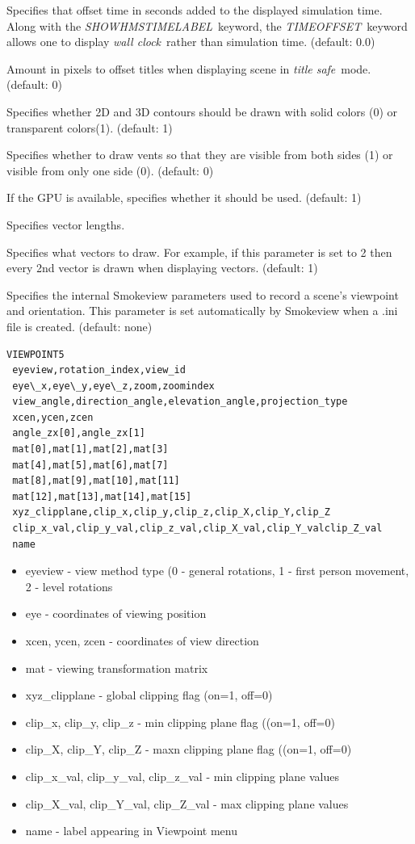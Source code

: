 \documentclass[11pt,twoside]{book}
\newcommand{\hitem}[1]{\item[{\bf #1} \hfill]}
\begin{document}
\hitem{TIMEOFFSET} Specifies that offset time in seconds added to
the displayed simulation time.  Along with the {\em
SHOWHMSTIMELABEL}\ keyword, the {\em TIMEOFFSET}\ keyword allows
one to display {\em wall clock}\ rather than simulation time.
(default: 0.0)

\hitem{TITLESAFE}Amount in pixels to offset titles when displaying
scene in {\em title safe}\ mode.   (default: 0)

\hitem{TRANSPARENT}Specifies whether 2D and 3D contours should be
drawn with solid colors (0) or transparent colors(1). (default: 1)

\hitem{TWOSIDEDVENTS}  Specifies whether to draw vents so that they are visible from
both sides (1) or visible from only one side (0).  (default: 0)

\hitem{USEGPU} If the GPU is available, specifies whether it should be used. (default: 1)


\hitem{VECLENGTH} Specifies vector lengths.

\hitem{VECTORSKIP}Specifies
what vectors to draw.  For example, if this parameter is set to 2 then
every 2nd vector is drawn when displaying vectors.
(default: 1)

\hitem{VIEWPOINT5}Specifies the internal Smokeview parameters used
to record a scene's viewpoint and orientation.  This parameter is
set automatically by Smokeview when a .ini file is created.
(default: none)

{\small
\begin{lstlisting}
VIEWPOINT5
 eyeview,rotation_index,view_id
 eye\_x,eye\_y,eye\_z,zoom,zoomindex
 view_angle,direction_angle,elevation_angle,projection_type
 xcen,ycen,zcen
 angle_zx[0],angle_zx[1]
 mat[0],mat[1],mat[2],mat[3]
 mat[4],mat[5],mat[6],mat[7]
 mat[8],mat[9],mat[10],mat[11]
 mat[12],mat[13],mat[14],mat[15]
 xyz_clipplane,clip_x,clip_y,clip_z,clip_X,clip_Y,clip_Z
 clip_x_val,clip_y_val,clip_z_val,clip_X_val,clip_Y_valclip_Z_val
 name
\end{lstlisting}
}

\begin{itemize}
\item eyeview - view method type (0 - general rotations,
1 - first person movement, 2 - level rotations
\item eye - coordinates of viewing position
\item xcen, ycen, zcen - coordinates of view direction
\item mat - viewing transformation matrix
\item xyz\_clipplane - global clipping flag (on=1, off=0)
\item clip\_x, clip\_y, clip\_z - min clipping plane flag ((on=1, off=0)
\item clip\_X, clip\_Y, clip\_Z - maxn clipping plane flag ((on=1, off=0)
\item clip\_x\_val, clip\_y\_val, clip\_z\_val - min clipping plane values
\item clip\_X\_val, clip\_Y\_val, clip\_Z\_val - max clipping plane values
\item name - label appearing in Viewpoint menu
\end{itemize}
\end{document}
